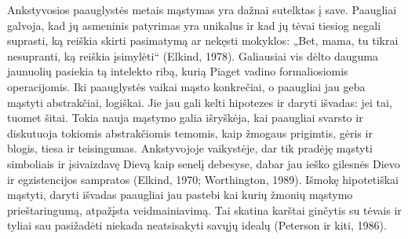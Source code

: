 \documentclass{article}
\begin{document}
Ankstyvosios paauglystės metais mąstymas yra dažnai sutelktas į save. Paaugliai
galvoja, kad jų asmeninis patyrimas yra unikalus ir kad jų tėvai tiesiog negali suprasti, ką reiškia skirti pasimatymą ar nekęsti mokyklos: „Bet, mama, tu tikrai nesupranti, ką reiškia įsimylėti“ (Elkind, 1978).
Galiausiai vis dėlto dauguma jaunuolių pasiekia tą intelekto ribą, kurią Piaget
vadino formaliosiomis operacijomis. Iki paauglystės vaikai mąsto konkrečiai, o
paaugliai jau geba mąstyti abstrakčiai, logiškai. Jie jau gali kelti hipotezes ir daryti
išvadas: jei tai, tuomet šitai. Tokia nauja mąstymo galia išryškėja, kai paaugliai
svarsto ir diskutuoja tokiomis abstrakčiomis temomis, kaip žmogaus prigimtis,
gėris ir blogis, tiesa ir teisingumas. Ankstyvojoje vaikystėje, dar tik pradėję
mąstyti simboliais ir įsivaizdavę Dievą kaip senelį debesyse, dabar jau ieško gilesnės
Dievo ir egzistencijos sampratos (Elkind, 1970; Worthington, 1989). Išmokę
hipotetiškai mąstyti, daryti išvadas paaugliai jau pastebi kai kurių žmonių
mąstymo prieštaringumą, atpažįsta veidmainiavimą. Tai skatina karštai ginčytis
su tėvais ir tyliai sau pasižadėti niekada neatsisakyti savųjų idealų (Peterson ir
kiti, 1986).

\end{document}
